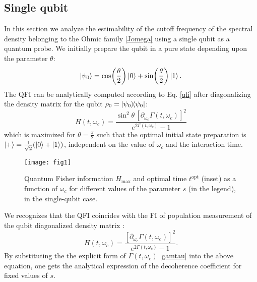 \documentclass[ pra,a4paper,aps,twocolumn,superscriptaddress]{revtex4-1}
\def\bra#1{\mathinner{\langle{#1}|}}
\def\ket#1{\mathinner{|{#1}\rangle}}
\def\tc#1{{\color{black}#1}}
\begin{document}
\subsection{Single qubit}
%
In this section we analyze the estimability of the cutoff frequency  of the  spectral density belonging to the  Ohmic family \eqref{Jomega} 
using a single qubit as a quantum probe. We initially prepare the qubit in a pure state  depending upon the parameter $\theta$:
\begin{equation}
\ket{\psi_0}=\cos\!\left(\frac{\theta}{2}\right)\ket{0}+\sin\!\left(\frac{\theta}{2}\right)\ket{1}.
\end{equation}
The QFI can be analytically computed according to Eq. \eqref{qfi} after diagonalizing the  density matrix for the qubit $\rho_0=\ket{\psi_0}\!\!\bra{\psi_0}$:
\begin{equation}
H(t,\omega_{c})=\frac{\sin^2\!\theta \, [\partial_{\omega_c} \Gamma(t,\omega_c)]^2 }{e^{2\Gamma(t,\omega_c)}-1}
\label{h1b}
\end{equation}
which is maximized for $\theta=\frac{\pi}{2}$ such that the optimal initial state preparation is 
$\ket{+}=\frac{1}{\sqrt{2}}(\vert0\rangle+\vert1\rangle)$,  \tc{independent on the value of $\omega_c$ and the interaction time.}
%
\begin{figure}
 \centering
     \texttt{[image: fig1]}
\caption{\label{opt1}  Quantum Fisher information  $H_{\text{max}}$ and optimal time $t^{\text{opt}}$ (inset) as a function of $\omega_c$ for different values of the parameter $s$ (in the legend), in the single-qubit case. }
 \end{figure}
%
We recognizes that the QFI coincides with the FI
of population measurement  of the qubit  diagonalized density matrix \cite{benedetti14}:
\begin{equation}
H(t,\omega_{c})=\frac{[\partial_{\omega_c} \Gamma(t,\omega_c)]^2 }{e^{2\Gamma(t,\omega_c)}-1}.
\label{QFsingle}
\end{equation}
By substituting the the explicit form of $\Gamma(t,\omega_c)$ \eqref{gamtau} into the above equation, one gets the analytical expression  of the decoherence coefficient for fixed values of $s$.
\end{document}
